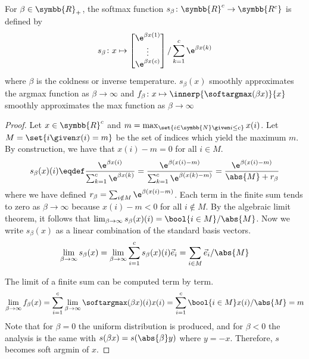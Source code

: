 \begin{lemma}
For \(\beta \in \symbb{R}_+\), the softmax function \(s_{\beta} \colon \symbb{R}^c \to \symbb{R^c}\) is defined by
\begin{equation*}
	s_{\beta} \colon x \mapsto \begin{bmatrix}
		\e^{\beta x(1)} \\
		\vdots          \\
		\e^{\beta x(c)}
	\end{bmatrix} / \sum_{k=1}^c \e^{\beta x(k)}
\end{equation*}
where \(\beta\) is the coldness or inverse temperature.
\(s_{\beta}(x)\) smoothly approximates the argmax function as \(\beta \to \infty\) and \(f_{\beta} \colon x \mapsto \innerp{\softargmax(\beta x)}{x}\) smoothly approximates the max function as \(\beta \to \infty\)
\end{lemma}
\begin{proof}
	Let \(x \in \symbb{R}^c\) and \(m = \max_{\set{i \in \symbb{N} \given i \leq c}} x(i)\).
	Let  \(M = \set{i \given x(i) = m}\) be the set of indices which yield the maximum \(m\).
	By construction, we have that \(x(i) - m = 0\) for all \(i \in M\).
	\begin{equation*}
		s_{\beta}(x)(i) \eqdef \frac{\e^{\beta x(i)}}{\sum_{k=1}^c \e^{\beta x(k)}}
		= \frac{\e^{\beta (x(i) - m)}}{\sum_{k=1}^c \e^{\beta (x(k) - m)}}
		= \frac{\e^{\beta (x(i) - m)}}{\abs{M} + r_{\beta}}
	\end{equation*}
	where we have defined \(r_{\beta} = \sum_{i \notin M} \e^{\beta(x(i) -m)}\).
	Each term in the finite sum tends to zero as \(\beta \to \infty\) because \(x(i) - m < 0\) for all \(i \notin M\).
	By the algebraic limit theorem, it follows that \(\lim_{\beta \to \infty} s_{\beta}(x)(i) = \bool{i \in M} / \abs{M}\).
	Now we write \(s_{\beta}(x)\) as a linear combination of the standard basis vectors.
	\[\lim_{\beta \to \infty} s_{\beta}(x) = \lim_{\beta \to \infty} \sum_{i=1}^c s_{\beta}(x)(i) \vec{e}_i = \sum_{i \in M} \vec{e}_i / \abs{M} \]

	The limit of a finite sum can be computed term by term.
	\begin{align*}
		\lim_{\beta \to \infty} f_{\beta}(x) = \sum_{i=1}^c \lim_{\beta \to \infty}  \softargmax(\beta x)(i) x(i)  = \sum_{i=1}^c \bool{i \in M} x(i) / \abs{M} = m
	\end{align*}
 Note that for \(\beta = 0\) the uniform distribution is produced, and for \(\beta < 0\) the analysis is the same with \(s(\beta x) = s(\abs{\beta} y)\) where \(y = -x\).
 Therefore, \(s\) becomes soft argmin of \(x\).
 \end{proof}
